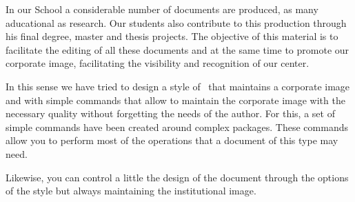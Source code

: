 
In our School a considerable number of documents are produced, as many aducational as research. Our students also contribute to this production
through his final degree, master and thesis projects. The objective of this material is to facilitate the editing of all these documents and at the same time to promote our corporate image, facilitating the visibility and recognition of our center.

In this sense we have tried to design a style of \LaTeXe\ that maintains a corporate image and with simple commands that allow to maintain the corporate image with the necessary quality without forgetting the needs of the author. For this, a set of simple commands have been created around complex packages. These commands allow you to perform most of the operations that a document of this type may need.

Likewise, you can control a little the design of the document through the options of the style but always maintaining the institutional image.
